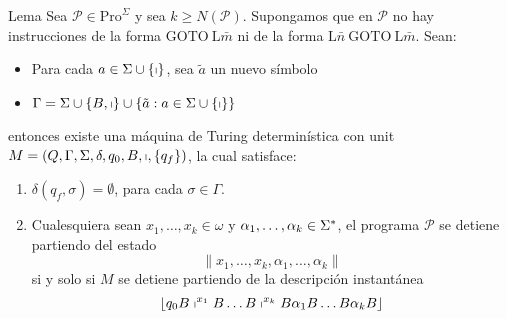 \begin{frame}
  \begin{alertblock}{Lema}
    \PN Sea $\mathcal{P} \in \mathrm{Pro}^{\Sigma}$ y sea $k \geq N(\mathcal{P})$. Supongamos que en $\mathcal{P}$ no
    hay instrucciones de la forma $\mathrm{GOTO} \ \mathrm{L}\bar{m}$ ni de la forma $\mathrm{L}\bar{n} \ \mathrm{GOTO}
    \ \mathrm{L}\bar{m}$. Sean:
    \begin{itemize}
      \item Para cada $a \in \Sigma \cup \{\shortmid\}$, sea $\tilde{a}$ un nuevo símbolo
      \item $\Gamma = \Sigma \cup \{B, \shortmid\} \cup \{\tilde{a}: a \in \Sigma \cup \{\shortmid\}\}$
    \end{itemize}
    \PN entonces existe una máquina de Turing determinística con unit $M = \left(Q, \Gamma, \Sigma, \delta, q_{0}, B,
    \shortmid,\{q_{f}\}\right)$, la cual satisface:
    \begin{enumerate}[1)]
      \item $\delta (q_{f},\sigma) = \emptyset$, para cada $\sigma \in \Gamma$.

      \item Cualesquiera sean $x_{1}, \dotsc, x_{k} \in \omega$ y $\alpha_{1}, \dotsc, \alpha_{k} \in \Sigma^{\ast}$, el
      programa $\mathcal{P}$ se detiene partiendo del estado
      \begin{equation*}
        \lVert x_{1}, \dotsc, x_{k}, \alpha_{1}, \dotsc, \alpha_{k} \rVert
      \end{equation*}
      \PN si y solo si $M$ se detiene partiendo de la descripción instantánea
      \begin{equation*}
        \left\lfloor q_{0} B \shortmid^{x_{1}} B \dotsc B \shortmid^{x_{k}} B \alpha_{1} B \dotsc B \alpha_{k} B
        \right\rfloor
      \end{equation*}
    \end{enumerate}
  \end{alertblock}
\end{frame}
